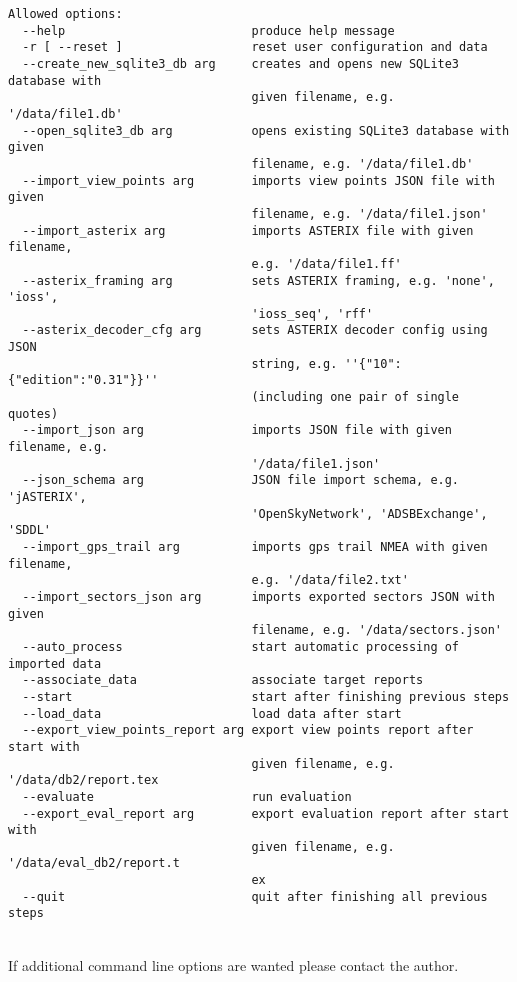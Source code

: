 \begin{lstlisting}
Allowed options:
  --help                          produce help message
  -r [ --reset ]                  reset user configuration and data
  --create_new_sqlite3_db arg     creates and opens new SQLite3 database with 
                                  given filename, e.g. '/data/file1.db'
  --open_sqlite3_db arg           opens existing SQLite3 database with given 
                                  filename, e.g. '/data/file1.db'
  --import_view_points arg        imports view points JSON file with given 
                                  filename, e.g. '/data/file1.json'
  --import_asterix arg            imports ASTERIX file with given filename, 
                                  e.g. '/data/file1.ff'
  --asterix_framing arg           sets ASTERIX framing, e.g. 'none', 'ioss', 
                                  'ioss_seq', 'rff'
  --asterix_decoder_cfg arg       sets ASTERIX decoder config using JSON 
                                  string, e.g. ''{"10":{"edition":"0.31"}}'' 
                                  (including one pair of single quotes)
  --import_json arg               imports JSON file with given filename, e.g. 
                                  '/data/file1.json'
  --json_schema arg               JSON file import schema, e.g. 'jASTERIX', 
                                  'OpenSkyNetwork', 'ADSBExchange', 'SDDL'
  --import_gps_trail arg          imports gps trail NMEA with given filename, 
                                  e.g. '/data/file2.txt'
  --import_sectors_json arg       imports exported sectors JSON with given 
                                  filename, e.g. '/data/sectors.json'
  --auto_process                  start automatic processing of imported data
  --associate_data                associate target reports
  --start                         start after finishing previous steps
  --load_data                     load data after start
  --export_view_points_report arg export view points report after start with 
                                  given filename, e.g. '/data/db2/report.tex
  --evaluate                      run evaluation
  --export_eval_report arg        export evaluation report after start with 
                                  given filename, e.g. '/data/eval_db2/report.t
                                  ex
  --quit                          quit after finishing all previous steps
\end{lstlisting}
\ \\

If additional command line options are wanted please contact the author.

